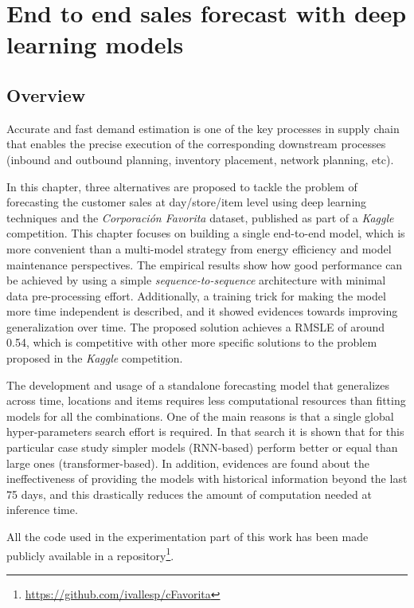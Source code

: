 \chapter{End to end sales forecast with deep learning models} \label{ch:salesforecast}

\section{Overview}
Accurate and fast demand estimation is one of the key processes in supply chain that enables the precise execution of the corresponding downstream processes (inbound and outbound planning, inventory placement, network planning, etc). 

In this chapter, three alternatives are proposed to tackle the problem of forecasting the customer sales at day/store/item level using deep learning techniques and the \textit{Corporación Favorita} dataset, published as part of a \textit{Kaggle} competition. This chapter focuses on building a single end-to-end model, which is more convenient than a multi-model strategy from  energy efficiency and  model maintenance perspectives. The empirical results show how good performance can be achieved by using a simple \textit{sequence-to-sequence} architecture with minimal data pre-processing effort. Additionally, a training trick for making the model more time independent is described, and it showed evidences towards improving generalization over time. The proposed solution achieves a RMSLE of around 0.54, which is competitive with other more specific solutions to the problem proposed in the \textit{Kaggle} competition.

The development and usage of a standalone forecasting model that generalizes across time, locations and items requires less computational resources than fitting models for all the combinations. One of the main reasons is that a single global hyper-parameters search effort is required. In that search it is shown that for this particular case study simpler models (RNN-based) perform better or equal than large ones (transformer-based). In addition, evidences are found about the ineffectiveness of providing the models with historical information beyond the last 75 days, and this drastically reduces the amount of computation needed at inference time.

 All the code used in the experimentation part of this work has been made publicly available in a repository\footnote{\url{https://github.com/ivallesp/cFavorita}}.


